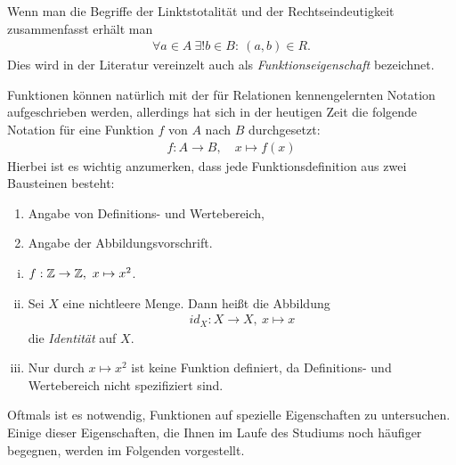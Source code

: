 \begin{remark}
Wenn man die Begriffe der Linktstotalität und der Rechtseindeutigkeit
zusammenfasst erhält man
\begin{align}
    \forall a \in A \  \exists ! b \in B : \ (a,b) \in R.
\end{align}
Dies wird in der Literatur vereinzelt auch als \textit{Funktionseigenschaft}
bezeichnet.
\end{remark}

\begin{remark}
Funktionen können natürlich mit der für Relationen kennengelernten Notation
aufgeschrieben werden, allerdings hat sich in der heutigen Zeit die folgende
Notation für eine Funktion $f$ von $A$ nach $B$ durchgesetzt:
\begin{align*}
    f : A \to B, \quad x \mapsto f(x)
\end{align*}
Hierbei ist es wichtig anzumerken, dass jede Funktionsdefinition aus zwei
Bausteinen besteht:
\begin{enumerate}
    \item Angabe von Definitions- und Wertebereich,
    \item Angabe der Abbildungsvorschrift.
\end{enumerate}
\end{remark}

\begin{example}
    \begin{enumerate}[(i)]
        \item
        $f: \mathbb{Z} \to \mathbb{Z}, \ x \mapsto x^2 $.
        \item
        Sei $X$ eine nichtleere Menge. Dann heißt die Abbildung
        \begin{align*}
            id_X : X \to X, \ x \mapsto x
        \end{align*}
        die \textit{Identität} auf $X$.
        \item
        Nur durch $x \mapsto x^2$ ist keine Funktion definiert, da Definitions- und Wertebereich nicht spezifiziert sind.
    \end{enumerate}
\end{example}

Oftmals ist es notwendig, Funktionen auf spezielle Eigenschaften zu untersuchen.
Einige dieser Eigenschaften, die Ihnen im Laufe des Studiums noch häufiger
begegnen, werden im Folgenden vorgestellt.

